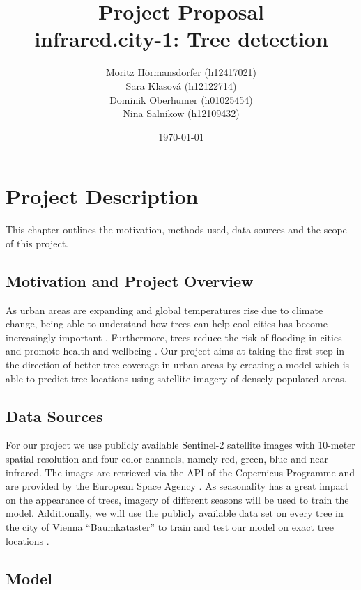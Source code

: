 \documentclass[12pt]{article}
\title{Project Proposal\\\large infrared.city-1: Tree detection}
\author{
Moritz Hörmansdorfer (h12417021) \\
Sara Klasová (h12122714) \\
Dominik Oberhumer (h01025454) \\
Nina Salnikow (h12109432) \\
}
\date{\today}
\begin{document}
\maketitle

\section{Project Description}

This chapter outlines the motivation, methods used, data sources and the scope of this project.

\subsection{Motivation and Project Overview}

As urban areas are expanding and global temperatures rise due to climate change, being able to understand how trees can help cool cities has become increasingly important \cite{eu2023tree}. Furthermore, trees reduce the risk of flooding in cities and promote health and wellbeing \cite{woodlandtrust2023}. Our project aims at taking the first step in the direction of better tree coverage in urban areas by creating a model which is able to predict tree locations using satellite imagery of densely populated areas.

\subsection{Data Sources}

For our project we use publicly available Sentinel-2 satellite images with 10-meter spatial resolution and four color channels, namely red, green, blue and near infrared. The images are retrieved via the API of the Copernicus Programme and are provided by the European Space Agency \cite{copernicus2025}. As seasonality has a great impact on the appearance of trees, imagery of different seasons will be used to train the model. Additionally, we will use the publicly available data set on every tree in the city of Vienna “Baumkataster” to train and test our model on exact tree locations \cite{baumkataster2025}.

\subsection{Model}
\end{document}
